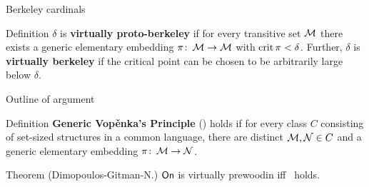 \begin{frame}{Berkeley cardinals}
  \begin{block}{Definition}
    $\delta$ is \textbf{virtually proto-berkeley} if for every transitive set $\operatorname{\mathcal M}$ there exists a generic elementary embedding $\pi\colon\operatorname{\mathcal M}\to\operatorname{\mathcal M}$ with $\operatorname{crit}\pi<\delta$. Further, $\delta$ is \textbf{virtually berkeley} if the critical point can be chosen to be arbitrarily large below $\delta$.
  \end{block}



\end{frame}

\begin{frame}{Outline of argument}

  \begin{block}{Definition}
    \textbf{Generic Vop\v enka's Principle} (\gvp) holds if for every class $C$ consisting of set-sized structures in a common language, there are distinct $\operatorname{\mathcal M},\operatorname{\mathcal N}\in C$ and a generic elementary embedding $\pi\colon\operatorname{\mathcal M}\to\operatorname{\mathcal N}$.
  \end{block}

  \pause 

  \begin{block}{Theorem (Dimopoulos-Gitman-N.)}
    $\textsf{On}$ is virtually prewoodin iff \gvp\ holds.
  \end{block}
\end{frame}

